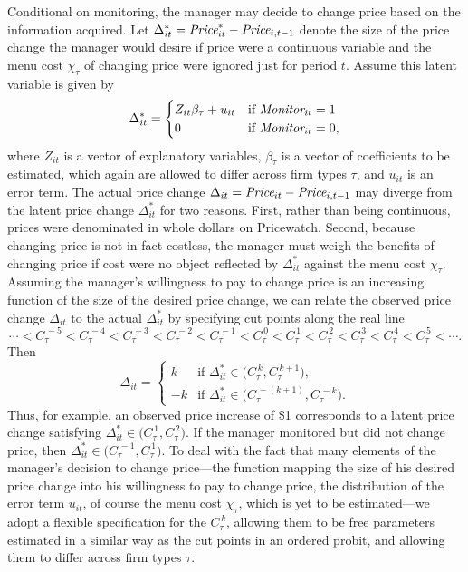 \documentclass[11pt]{article}
\newcommand{\Price}{\mbox{\it Price}}
\newcommand{\Monitor}{\mbox{\it Monitor}}
\newcommand{\cut}[1]{C_{\tau}^{\,#1}}
\begin{document}
\begin{spacing}{1.3}
Conditional on monitoring, the manager may decide to change price
based on the information acquired. Let $\Delta_{it}^* = \Price_{it}^*
- \Price_{i,t-1}$ denote the size of the price change the manager
would desire if price were a continuous variable and the menu cost
$\chi_{\tau}$ of changing price were ignored just for period
$t$. Assume this latent variable is given by
\begin{equation}
\label{latentpricechange}
\Delta_{it}^* = \begin{cases}
 Z_{it} \beta_{\tau} + u_{it} & \text{if $\Monitor_{it} = 1$} \\
 0 & \text{if $\Monitor_{it} = 0$,}
\end{cases}
\end{equation}
where $Z_{it}$ is a vector of explanatory variables, $\beta_{\tau}$ is
a vector of coefficients to be estimated, which again are allowed to
differ across firm types $\tau$, and $u_{it}$ is an error term. The
actual price change $\Delta_{it} = \Price_{it} - \Price_{i,t-1}$ may
diverge from the latent price change $\Delta_{it}^*$ for two
reasons. First, rather than being continuous, prices were denominated
in whole dollars on Pricewatch. Second, because changing price is not
in fact costless, the manager must weigh the benefits of changing
price if cost were no object reflected by $\Delta_{it}^*$ against the
menu cost $\chi_{\tau}$. Assuming the manager's willingness to pay to
change price is an increasing function of the size of the desired
price change, we can relate the observed price change $\Delta_{it}$ to
the actual $\Delta_{it}^*$ by specifying cut points along the real
line
\begin{equation}
\label{C}
\cdots < \cut{-5} < \cut{-4} < \cut{-3} < \cut{-2} < \cut{-1} <
\cut{0} < \cut{1} < \cut{2} < \cut{3} < \cut{4} < \cut{5} < \cdots .
\end{equation}
Then
\begin{equation}
\label{pricechange}
\Delta_{it} = \begin{cases}
k & \text{if $\Delta_{it}^* \in \bigl( \cut{k}, \cut{k+1} \bigr)$,} \\[1ex]
-k & \text{if $\Delta_{it}^* \in \bigl( \cut{-(k+1)}, \cut{-k} \bigr)$.}
\end{cases}
\end{equation}
Thus, for example, an observed price increase of \$1 corresponds to a
latent price change satisfying $\Delta_{it}^* \in \bigl( \cut{1},
\cut{2} \bigr)$. If the manager monitored but did not change price,
then $\Delta_{it}^* \in \bigl( \cut{-1}, \cut{1} \bigr)$. To deal with
the fact that many elements of the manager's decision to change
price---the function mapping the size of his desired price change into
his willingness to pay to change price, the distribution of the error
term $u_{it}$, of course the menu cost $\chi_{\tau}$, which is yet to
be estimated---we adopt a flexible specification for the $\cut{k}$,
allowing them to be free parameters estimated in a similar way as the
cut points in an ordered probit, and allowing them to differ across
firm types $\tau$.


\end{spacing}
\end{document}
